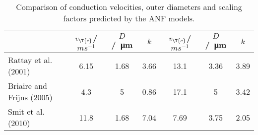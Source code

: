 \begin{table}[htb]
\centering
\caption{Comparison of conduction velocities, outer diameters and scaling factors predicted by the ANF models.}
\begin{tabular}{l|cccccc}
& $v_{\T{c}}$/$ms^{-1}$ & $D$/\SI{}{\micro\meter} & $k$ & $v_{\T{c}}$/$ms^{-1}$ & $D$/\SI{}{\micro\meter} & $k$\\\hline
Rattay et al. (2001) & 6.15 & 1.68 & 3.66 & 13.1 & 3.36 & 3.89\\
Briaire and Frijns (2005) & 4.3 & 5 & 0.86 & 17.1 & 5 & 3.42\\
Smit et al. (2010) & 11.8 & 1.68 & 7.04 & 7.69 & 3.75 & 2.05\\
\end{tabular}
\label{tbl:con_vel_table2}
\end{table}